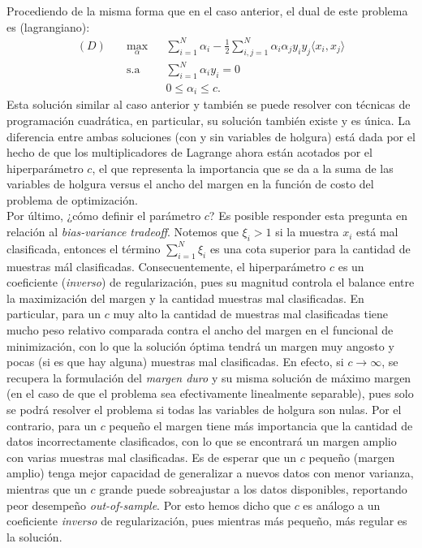 Procediendo de la misma forma que en el caso anterior, el dual de este problema es (lagrangiano):
\begin{equation}
\begin{aligned}
(D)\quad & \underset{\alpha}{\text{max}}
& & \sum\limits_{i=1}^{N}\alpha_i - \frac{1}{2} \sum\limits_{i,j=1}^{N} \alpha_i \alpha_j y_i y_j \langle x_i, x_j\rangle\\
& \text{s.a}
& & \sum\limits_{i=1}^{N} \alpha_i y_i= 0 \\
& &  &0 \leq \alpha_i \leq c.
\end{aligned}
\end{equation}
Esta solución similar al caso anterior y también se puede resolver con técnicas de programación cuadrática, en particular, su solución también existe y es única. La diferencia entre ambas soluciones (con y sin variables de holgura) está dada por el hecho de que los multiplicadores de Lagrange ahora están acotados por el hiperparámetro $c$, el que representa la importancia que se da a la suma de las variables de holgura versus el ancho del margen en la función de costo del problema de optimización.\\

Por último, ¿cómo definir el parámetro $c$? Es posible responder esta pregunta en relación al \textit{bias-variance tradeoff}. Notemos que $\xi_i>1$ si la muestra $x_i$ está mal clasificada, entonces el término $\sum_{i=1}^{N} \xi_i$ es una cota superior para la cantidad de muestras mál clasificadas. Consecuentemente, el hiperparámetro $c$ es un coeficiente (\emph{inverso}) de regularización, pues su magnitud controla el balance entre la maximización del margen y la cantidad muestras mal clasificadas. En particular, para un $c$ muy alto la cantidad de muestras mal clasificadas tiene mucho peso relativo comparada contra el ancho del margen en el funcional de minimización, con lo que la solución óptima tendrá un margen muy angosto y pocas (si es que hay alguna) muestras mal clasificadas. En efecto, si $c\to\infty$, se recupera la formulación del \emph{margen duro} y su misma solución de máximo margen (en el caso de que el problema sea efectivamente linealmente separable), pues solo se podrá resolver el problema si todas las variables de holgura son nulas. Por el contrario, para un $c$ pequeño el margen tiene más importancia que la cantidad de datos incorrectamente clasificados, con lo que se encontrará un margen amplio con varias muestras mal clasificadas. Es de esperar que un $c$ pequeño (margen amplio) tenga mejor capacidad de generalizar a nuevos datos con menor varianza, mientras que un $c$ grande puede sobreajustar a los datos disponibles, reportando peor desempeño \emph{out-of-sample}. Por esto hemos dicho que $c$ es análogo a un coeficiente \emph{inverso} de regularización, pues mientras más pequeño, más regular es la solución. \\


